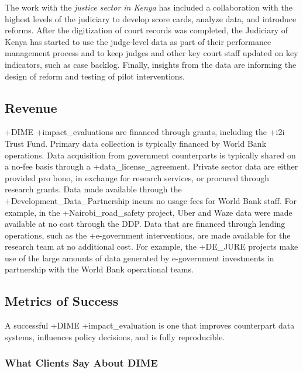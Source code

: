 \documentclass[
]{book}
\begin{document}
The work with the \emph{justice sector in Kenya} has included a collaboration with the highest levels of the judiciary to develop score cards, analyze data, and introduce reforms. After the digitization of court records was completed, the Judiciary of Kenya has started to use the judge-level data as part of their performance management process and to keep judges and other key court staff updated on key indicators, such as case backlog. Finally, insights from the data are informing the design of reform and testing of pilot interventions.

\hypertarget{revenue-6}{%
\subsection{Revenue}\label{revenue-6}}

+DIME\textbar{} +impact\_evaluations\textbar{} are financed through grants, including the +i2i\textbar{} Trust Fund. Primary data collection is typically financed by World Bank operations. Data acquisition from government counterparts is typically shared on a no-fee basis through a +data\_license\_agreement\textbar. Private sector data are either provided pro bono, in exchange for research services, or procured through research grants. Data made available through the +Development\_Data\_Partnership\textbar{} incurs no usage fees for World Bank staff. For example, in the +Nairobi\_road\_safety\textbar{} project, Uber and Waze data were made available at no cost through the DDP. Data that are financed through lending operations, such as the +e-government\textbar{} interventions, are made available for the research team at no additional cost. For example, the +DE\_JURE\textbar{} projects make use of the large amounts of data generated by e-government investments in partnership with the World Bank operational teams.

\hypertarget{metrics-of-success-6}{%
\subsection{Metrics of Success}\label{metrics-of-success-6}}

A successful +DIME\textbar{} +impact\_evaluation\textbar{} is one that improves counterpart data systems, influences policy decisions, and is fully reproducible.

\hypertarget{what-clients-say-about-dime}{%
\subsubsection*{What Clients Say About DIME}\label{what-clients-say-about-dime}}
\end{document}
